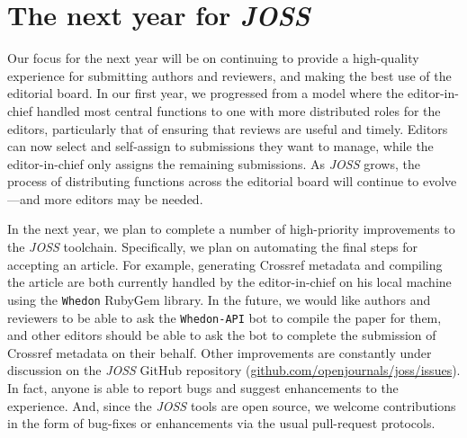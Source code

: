 \documentclass{article}
\newcommand\joss{\textit{JOSS}}
\begin{document}
\section{The next year for \joss{}}

Our focus for the next year will be on continuing to provide a high-quality experience
for submitting authors and reviewers, and making the best use of the editorial board.
In our first year, we progressed from a model where the editor-in-chief handled
most central functions to one with more distributed roles for the editors,
particularly that of ensuring that reviews are useful and timely.
Editors can now select and self-assign to submissions they want to manage, while the editor-in-chief only assigns the remaining submissions.
As \joss{} grows, the process of distributing functions across the editorial board will continue to evolve---and more editors may be needed.

In the next year, we plan to complete a number of high-priority improvements to the \joss{} toolchain.
Specifically, we plan on automating the final steps for accepting an article.
For example, generating Crossref metadata and compiling the article are both currently handled by the editor-in-chief on his local machine using the \texttt{Whedon} RubyGem library.
In the future, we would like authors and reviewers to be able to ask the \texttt{Whedon-API} bot to compile the paper for them, and other editors should be able to ask the bot to complete the submission of Crossref metadata on their behalf.
Other improvements are constantly under discussion on the \joss{} GitHub repository
(\href{https://github.com/openjournals/joss/issues}{github.com/openjournals/joss/issues}).
In fact, anyone is able to report bugs and suggest enhancements to the experience.
And, since the \joss{} tools are open source, we welcome contributions in the form of bug-fixes or enhancements via the usual pull-request protocols.
\end{document}

